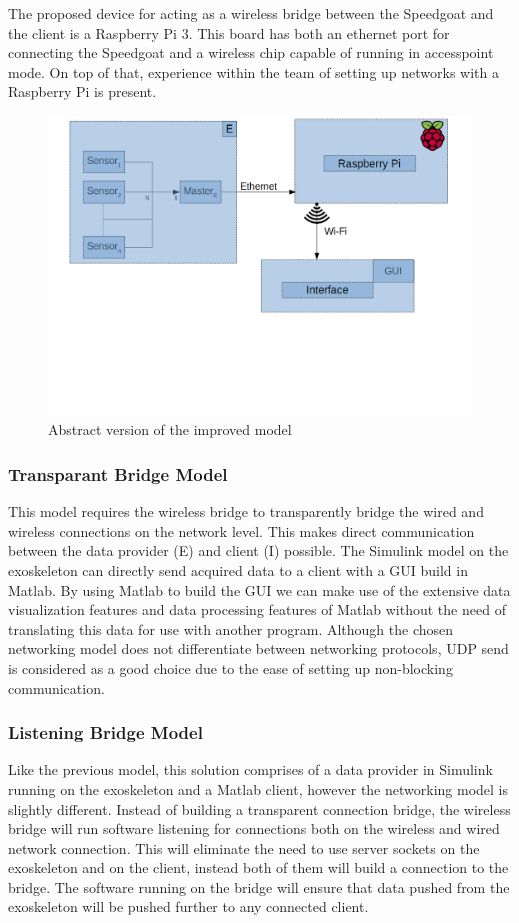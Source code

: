 The proposed device for acting as a wireless bridge between the Speedgoat and the client is a Raspberry Pi 3. This board has both an ethernet port for connecting the Speedgoat and a wireless chip capable of running in accesspoint mode. On top of that, experience within the team of setting up networks with a Raspberry Pi is present.\\

\begin{figure}[H]
	\centering
	\includegraphics[width=.75\textwidth]{research/ERBI-Model-RaspPie}
	\caption{Abstract version of the improved model} 
	\label{fig:improvedmodel}
\end{figure} 

\subsubsection{Transparant Bridge Model}\label{sec:tbm}
This model requires the wireless bridge to transparently bridge the wired and wireless connections on the network level. This makes direct communication between the data provider (E) and client (I) possible. The Simulink model on the exoskeleton can directly send acquired data to a client with a GUI build in Matlab. By using Matlab to build the GUI we can make use of the extensive data visualization features and data processing features of Matlab without the need of translating this data for use with another program. 
Although the chosen networking model does not differentiate between networking protocols, UDP send \cite{web:UDPSend} is considered as a good choice due to the ease of setting up non-blocking communication.

\subsubsection{Listening Bridge Model}\label{sec:lbm}
Like the previous model, this solution comprises of a data provider in Simulink running on the exoskeleton and a Matlab client, however the networking model is slightly different. Instead of building a transparent connection bridge, the wireless bridge will run software listening for connections both on the wireless and wired network connection. This will eliminate the need to use server sockets on the exoskeleton and on the client, instead both of them will build a connection to the bridge. The software running on the bridge will ensure that data pushed from the exoskeleton will be pushed further to any connected client.

